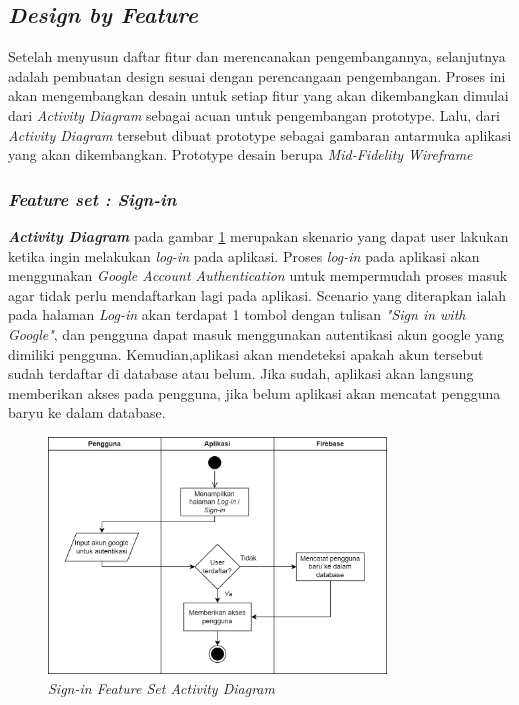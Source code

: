 \subsection{\textit{Design by Feature}}
Setelah menyusun daftar fitur dan merencanakan pengembangannya, selanjutnya adalah pembuatan design sesuai dengan perencangaan pengembangan.
Proses ini akan mengembangkan desain untuk setiap fitur yang akan dikembangkan dimulai dari \textit{Activity Diagram} sebagai acuan untuk pengembangan prototype. 
Lalu, dari \textit{Activity Diagram} tersebut dibuat prototype sebagai gambaran antarmuka aplikasi yang akan dikembangkan.
Prototype desain berupa \textit{Mid-Fidelity Wireframe}
\subsubsection{\textit{Feature set : Sign-in}}
\textbf{\textit{Activity Diagram}} pada gambar \ref*{Fig:ActivityDiagramSignIn} merupakan skenario yang dapat user lakukan ketika ingin melakukan \textit{log-in} pada aplikasi.
Proses \textit{log-in} pada aplikasi akan menggunakan \textit{Google Account Authentication} untuk mempermudah proses masuk agar tidak perlu mendaftarkan lagi pada aplikasi.
Scenario yang diterapkan ialah pada halaman \textit{Log-in} akan terdapat 1 tombol dengan tulisan \textit{"Sign in with Google"}, dan pengguna dapat masuk menggunakan autentikasi akun google yang dimiliki pengguna.
Kemudian,aplikasi akan mendeteksi apakah akun tersebut sudah terdaftar di database atau belum. Jika sudah, aplikasi akan langsung memberikan akses pada pengguna, jika belum aplikasi akan mencatat pengguna baryu ke dalam database.
\begin{figure}[H]
	\centering
	\includegraphics[width=0.8\textwidth]{contents/chapter-3/images/AD-signin.png}
	\caption{\textit{Sign-in Feature Set Activity Diagram}}
	\label{Fig:ActivityDiagramSignIn}
\end{figure}
